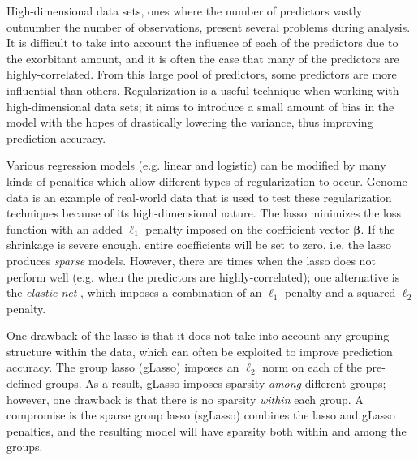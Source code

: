 \documentclass[11pt]{article}
\begin{document}




   
High-dimensional data sets, ones where the number of predictors vastly outnumber the number of observations, present several problems during analysis. It is difficult to take into account the influence of each of the predictors due to the exorbitant amount, and it is often the case that many of the predictors are highly-correlated. From this large pool of predictors, some predictors are more influential than others. Regularization is a useful technique when working with high-dimensional data sets; it aims to introduce a small amount of bias in the model with the hopes of drastically lowering the variance, thus improving prediction accuracy.

Various regression models (e.g. linear and logistic) can be modified by many kinds of penalties which allow different types of regularization to occur. Genome data is an example of real-world data that is used to test these regularization techniques because of its high-dimensional nature. The lasso \cite{tibshirani1996regression} minimizes the loss function with an added $\ell_1$ penalty imposed on the coefficient vector $\bm{\beta}$. If the shrinkage is severe enough, entire coefficients will be set to zero, i.e. the lasso produces \textit{sparse} models. However, there are times when the lasso does not perform well (e.g. when the predictors are highly-correlated); one alternative is the \textit{elastic net} \cite{zou2005regularization}, which imposes a combination of an $\ell_1$ penalty and a squared $\ell_2$ penalty. 

One drawback of the lasso is that it does not take into account any grouping structure within the data, which can often be exploited to improve prediction accuracy. The group lasso (gLasso) \cite{yuan2006model} imposes an $\ell_2$ norm on each of the pre-defined groups. As a result, gLasso imposes sparsity \textit{among} different groups; however, one drawback is that there is no sparsity \textit{within} each group. A compromise is the sparse group lasso (sgLasso) \cite{friedman2010note} combines the lasso and gLasso penalties, and the resulting model will have sparsity both within and among the groups. %
\end{document}
